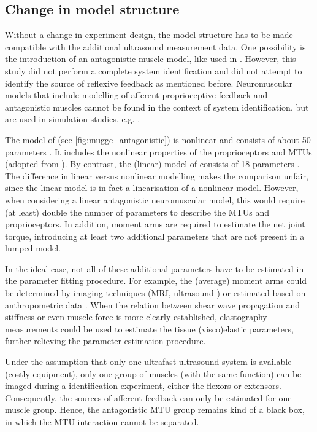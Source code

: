 \subsection{Change in model structure}
\label{sec:change_model_structure}
Without a change in experiment design, the model structure has to be made compatible with the additional ultrasound measurement data. One possibility is the introduction of an antagonistic muscle model, like used in \cite{de_gooijer-van_de_groep_estimation_2016}. However, this study did not perform a complete system identification and did not attempt to identify the source of reflexive feedback as mentioned before. Neuromuscular models that include modelling of afferent proprioceptive feedback and antagonistic muscles cannot be found in the context of system identification, but are used in simulation studies, e.g. \cite{munts_fixed_2011, mugge_modeling_2012}. 

The model of \citeauthor{mugge_modeling_2012} (see \autoref{fig:mugge_antagonistic}) is nonlinear and consists of about 50 parameters \cite{mugge_modeling_2012}. It includes the nonlinear properties of the proprioceptors and MTUs (adopted from \cite{winters_analysis_1985, stroeve_neuromuscular_1998}). By contrast, the (linear) model of \citeauthor{schouten_nmclab_2008} consists of 18 parameters \cite{schouten_nmclab_2008}. The difference in linear versus nonlinear modelling makes the comparison unfair, since the linear model is in fact a linearisation of a nonlinear model. However, when considering a linear antagonistic neuromuscular model, this would require (at least) double the number of parameters to describe the MTUs and proprioceptors. In addition, moment arms are required to estimate the net joint torque, introducing at least two additional parameters that are not present in a lumped model. 

In the ideal case, not all of these additional parameters have to be estimated in the parameter fitting procedure. For example, the (average) moment arms could be determined by imaging techniques (MRI, ultrasound \cite{fath_direct_2010}) or estimated based on anthropometric data \cite{ramsay_muscle_2009}. When the relation between shear wave propagation and stiffness or even muscle force is more clearly established, elastography measurements could be used to estimate the tissue (visco)elastic parameters, further relieving the parameter estimation procedure. 

Under the assumption that only one ultrafast ultrasound system is available (costly equipment), only one group of muscles (with the same function) can be imaged during a identification experiment, either the flexors or extensors. Consequently, the sources of afferent feedback can only be estimated for one muscle group. Hence, the antagonistic MTU group remains kind of a black box, in which the MTU interaction cannot be separated. 

